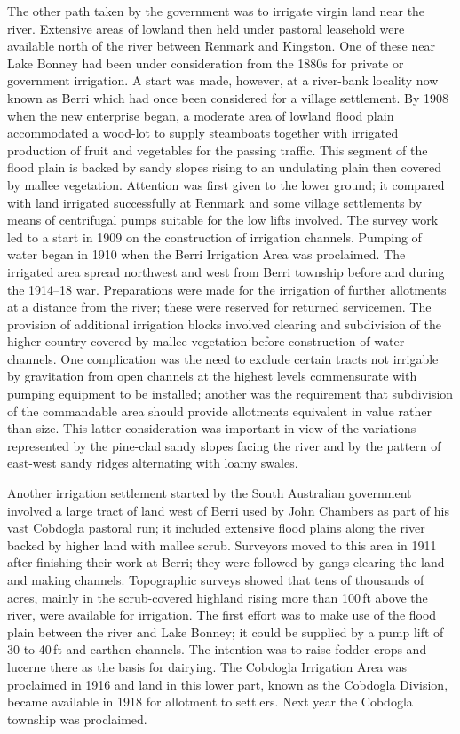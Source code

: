 The other path taken by the government was to irrigate virgin land
near the river.  Extensive areas of lowland then held under pastoral
leasehold were available north of the river between Renmark and
Kingston.  One of these near Lake Bonney had been under consideration
from the 1880s for private or government irrigation.  A start was
made, however, at a river-bank locality now known as Berri which had
once been considered for a village settlement.  By 1908 when the new
enterprise began, a moderate area of lowland flood plain accommodated
a wood-lot to supply steamboats together with irrigated production of
fruit and vegetables for the passing traffic.  This segment of the
flood plain is backed by sandy slopes rising to an undulating plain
then covered by mallee vegetation.  Attention was first given to the
lower ground; it compared with land irrigated successfully at Renmark
and some village settlements by means of centrifugal pumps suitable
for the low lifts involved.  The survey work led to a start in 1909 on
the construction of irrigation channels.  Pumping of water began in
1910 when the Berri Irrigation Area was proclaimed.
The irrigated area spread northwest and west from Berri township
before and during the 1914--18 war. Preparations were made for the irrigation of further
allotments at a distance from the river; these were reserved for
returned servicemen.  The provision of additional irrigation blocks
involved clearing and subdivision of the higher country covered by
mallee vegetation before construction of water channels.  One
complication was the need to exclude certain tracts not irrigable by
gravitation from open channels at the highest levels commensurate with
pumping equipment to be installed; another was the requirement that
subdivision of the commandable area should provide allotments
equivalent in value rather than size.  This latter consideration was
important in view of the variations represented by the pine-clad sandy
slopes facing the river and by the pattern of east-west sandy ridges
alternating with loamy swales.

Another irrigation settlement started by the South Australian
government involved a large tract of land west of Berri used by John
Chambers as part of his vast Cobdogla pastoral run; it included
extensive flood plains along the river backed by higher land with
mallee scrub.  Surveyors moved to this area in 1911 after finishing
their work at Berri; they were followed by gangs clearing the land and
making channels.  Topographic surveys showed that tens of thousands of
acres, mainly in the scrub-covered highland rising more than 100\,ft
above the river, were available for irrigation.  The first effort was
to make use of the flood plain between the river and Lake Bonney; it
could be supplied by a pump lift of 30 to 40\,ft and earthen
channels. The intention was to raise fodder crops and lucerne there as
the basis for dairying.  The Cobdogla Irrigation Area was proclaimed
in 1916 and land in this lower part, known as the Cobdogla Division,
became available in 1918 for allotment to settlers. Next year the Cobdogla
township was proclaimed.

